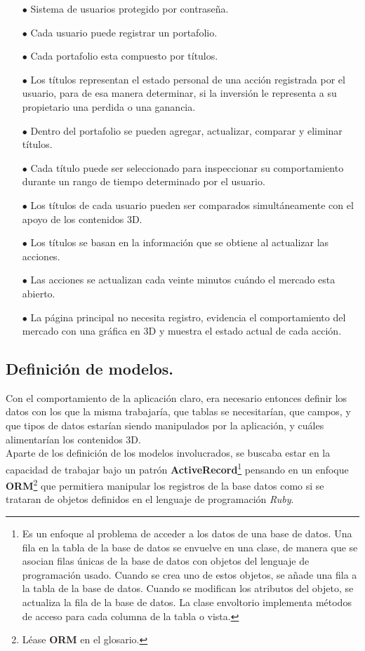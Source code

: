 \begin{itemize}
\item[$\bullet$] Sistema de usuarios protegido por contraseña.
\item[$\bullet$] Cada usuario puede registrar un portafolio.
\item[$\bullet$] Cada portafolio esta compuesto por títulos.
\item[$\bullet$] Los títulos representan el estado personal de una acción registrada por el usuario, para de esa manera determinar, si la inversión le representa a su propietario una perdida o una ganancia.
\item[$\bullet$] Dentro del portafolio se pueden agregar, actualizar, comparar y eliminar títulos.
\item[$\bullet$] Cada título puede ser seleccionado para inspeccionar su comportamiento durante un rango de tiempo determinado por el usuario.
\item[$\bullet$] Los títulos de cada usuario pueden ser comparados simultáneamente con el apoyo de los contenidos 3D.
\item[$\bullet$] Los títulos se basan en la información que se obtiene al actualizar las acciones.
\item[$\bullet$] Las acciones se actualizan cada veinte minutos cuándo el mercado esta abierto.
\item[$\bullet$] La página principal no necesita registro, evidencia el comportamiento del mercado con una gráfica en 3D y muestra el estado actual de cada acción.
\end{itemize}

\subsection{Definición de modelos.}

Con el comportamiento de la aplicación claro, era necesario entonces definir los datos con los que la misma trabajaría, que tablas se necesitarían, que campos, y que tipos de datos estarían siendo manipulados por la aplicación, y cuáles  alimentarían los contenidos 3D.\\

Aparte de los definición de los modelos involucrados, se buscaba estar en la capacidad de trabajar bajo un patrón \textbf{ActiveRecord}\footnote{Es un enfoque al problema de acceder a los datos de una base de datos. Una fila en la tabla de la base de datos se envuelve en una clase, de manera que se asocian filas únicas de la base de datos con objetos del lenguaje de programación usado. Cuando se crea uno de estos objetos, se añade una fila a la tabla de la base de datos. Cuando se modifican los atributos del objeto, se actualiza la fila de la base de datos. La clase envoltorio implementa métodos de acceso para cada columna de la tabla o vista.} pensando en un enfoque \textbf{ORM}\footnote{Léase \textbf{ORM} en el glosario.} que permitiera manipular los registros de la base datos como si se trataran de objetos definidos en el lenguaje de programación \emph{Ruby}.\\

